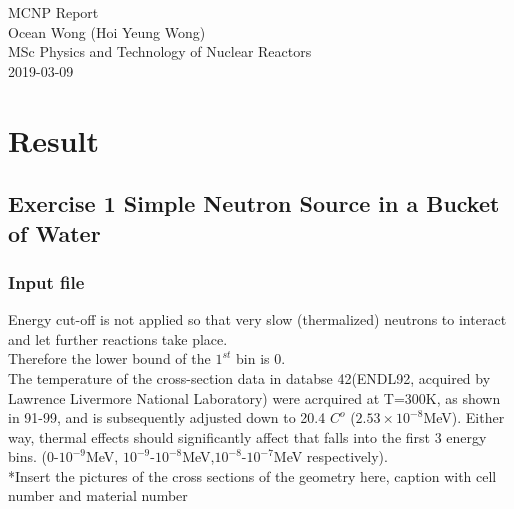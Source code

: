 \documentclass[a4paper, 12pt]{article}
\begin{document}
\begin{center}
MCNP Report										\\
Ocean Wong (Hoi Yeung Wong)						\\
MSc Physics and Technology of Nuclear Reactors	\\
2019-03-09 										\\
\end{center}
\section{Result}
\subsection{Exercise 1 Simple Neutron Source in a Bucket of Water}
\subsubsection{Input file}
Energy cut-off is not applied so that very slow (thermalized) neutrons to interact and let further reactions take place.
\\Therefore the lower bound of the $1^{st}$ bin is 0.
\\The temperature of the cross-section data in databse 42(ENDL92, acquired by Lawrence Livermore National Laboratory) were acrquired at T=300K, as shown in 91-99, and is subsequently adjusted down to 20.4 $C^{o}$ ($2.53 \times 10^{-8}$MeV). Either way, thermal effects should significantly affect that falls into the first 3 energy bins. ($0$-$10^{-9}$MeV, $10^{-9}$-$10^{-8}$MeV,$10^{-8}$-$10^{-7}$MeV respectively).
\\*Insert the pictures of the cross sections of the geometry here, caption with cell number and material number\\
\end{document}
